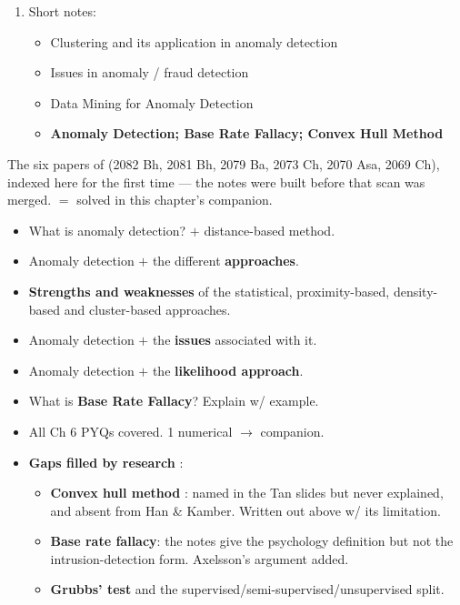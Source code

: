 \begin{enumerate}
  \item {} Short notes:
  \begin{itemize}
    \item Clustering and its application in anomaly detection \hfill {} 
    \item Issues in anomaly / fraud detection \hfill {} 
    \item Data Mining for Anomaly Detection \hfill {} 
    \item \textbf{Anomaly Detection; Base Rate Fallacy; Convex Hull Method} \hfill {} 
  \end{itemize}
\end{enumerate}

{\color{sub}\footnotesize The six papers of  (2082 Bh, 2081 Bh, 2079 Ba, 2073 Ch, 2070 Asa, 2069 Ch), indexed here for the
first time --- the notes were built before that scan was merged.  $=$ solved in this chapter's companion. \added}
\begin{itemize}
  \item What is anomaly detection? $+$ distance-based method. \hfill {} 
  \item Anomaly detection $+$ the different \textbf{approaches}. \hfill {} 
  \item \textbf{Strengths and weaknesses} of the statistical, proximity-based, density-based and cluster-based approaches. \hfill {} 
  \item Anomaly detection $+$ the \textbf{issues} associated with it. \hfill {} 
  \item Anomaly detection $+$ the \textbf{likelihood approach}. \hfill {}  \added
  \item What is \textbf{Base Rate Fallacy}? Explain w/ example. \hfill {} 
\end{itemize}

\begin{itemize}
  \item All Ch 6 PYQs covered. 1 numerical  $\rightarrow$ companion.
  \item \textbf{Gaps filled by research} \added:
  \begin{itemize}
    \item \textbf{Convex hull method} : named in the Tan slides but never explained,
          and absent from Han \& Kamber. Written out above w/ its limitation.
    \item \textbf{Base rate fallacy}: the notes give the psychology definition but not the
          intrusion-detection form. Axelsson's argument added.
    \item \textbf{Grubbs' test} and the supervised/semi-supervised/unsupervised split.
  \end{itemize}
\end{itemize}

